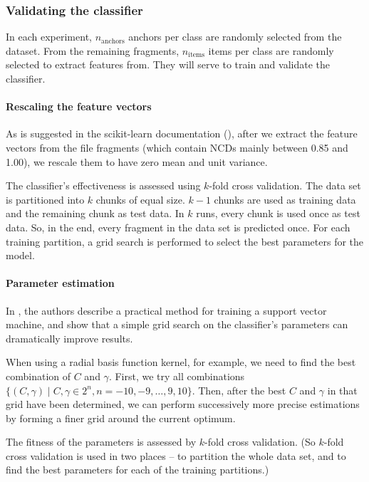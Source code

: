 \subsubsection{Validating the classifier}

In each experiment, $n_{\text{anchors}}$ anchors per class are randomly selected from
the dataset. From the remaining fragments, $n_{\text{items}}$ items per
class are randomly selected to extract features from. They will serve to
train and validate the classifier.

\paragraph{Rescaling the feature vectors} As is suggested in the
scikit-learn documentation (\cite{Pedregosa2011}), after we extract the
feature vectors from the file fragments (which contain NCDs mainly between
0.85 and 1.00), we rescale them to have zero mean and unit variance.

The classifier's effectiveness is assessed using $k$-fold cross
validation. The data set is partitioned into $k$ chunks of equal size. $k
- 1$ chunks are used as training data and the remaining chunk as test
data. In $k$ runs, every chunk is used once as test data. So, in the end,
every fragment in the data set is predicted once. For each training
partition, a grid search is performed to select the best parameters for
the model.


\paragraph{Parameter estimation}

In \cite{Chih2008}, the authors describe a practical method for training
a support vector machine, and show that a simple grid search on the
classifier's parameters can dramatically improve results.

When using a radial basis function kernel, for example, we need to find
the best combination of $C$ and $\gamma$. First, we try all combinations
$ \{ (C, \gamma) \mid C, \gamma \in 2^{n}, n = -10, -9, \dots, 9, 10 \}$.
Then, after the best $C$ and $\gamma$ in that grid have been determined,
we can perform successively more precise estimations by forming a finer
grid around the current optimum.

The fitness of the parameters is assessed by $k$-fold cross validation.
(So $k$-fold cross validation is used in two places -- to partition
the whole data set, and to find the best parameters for each of the
training partitions.)


